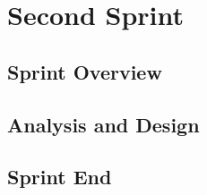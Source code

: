 \chapter{Second Sprint}\label{chap:sprint2}

\section{Sprint Overview}\label{sec:sprint2:overview}


\section{Analysis and Design}\label{sec:sprint2:analysis}





\section{Sprint End}\label{sec:sprint2:review}

